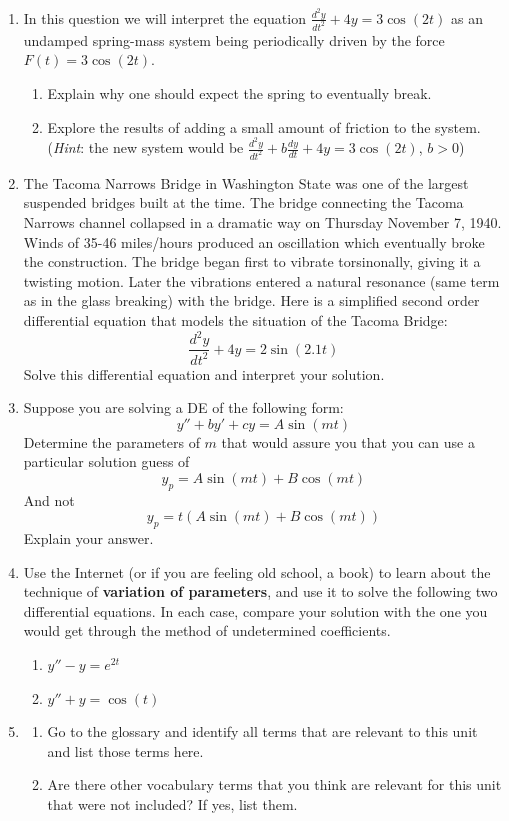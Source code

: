 \begin{enumerate}
\clearpage

\item In this question we will interpret the equation $\displaystyle\frac{d^2y}{dt^2} + 4y = 3\cos(2t)$ as an undamped spring-mass system being periodically driven by the force $F(t) = 3\cos(2t)$. \label{13HWproblem6}
\begin{enumerate}
\item Explain why one should expect the spring to eventually break. \label{13HWproblem6parta}
\item Explore the results of adding a small amount of friction to the system. (\textit{Hint}: the new system would be $\displaystyle\frac{d^2y}{dt^2} + b\frac{dy}{dt} + 4y = 3\cos(2t)$, $b>0$) \label{13HWproblem6partb}
\end{enumerate}

\item The Tacoma Narrows Bridge in Washington State was one of the largest suspended bridges built at the time. The bridge connecting the Tacoma Narrows channel collapsed in a dramatic way on Thursday November 7, 1940. Winds of 35-46 miles/hours produced an oscillation which eventually broke the construction. The bridge began first to vibrate torsinonally, giving it a twisting motion. Later the vibrations entered a natural resonance (same term as in the glass breaking) with the bridge. Here is a simplified second order differential equation that models the situation of the Tacoma Bridge: \label{13HWproblem7}
\[
\frac{d^2y}{dt^2}+4y=2\sin(2.1t)
\]
Solve this differential equation and interpret your solution.

\item Suppose you are solving a DE of the following form: \label{13HWproblem8}
\[
y''+by'+cy=A\sin(mt)
\]
Determine the parameters of $m$ that would assure you that you can use a particular solution guess of
\[
y_p=A\sin(mt)+B\cos(mt)
\]
And not
\[
y_p=t(A\sin(mt)+B\cos(mt))
\]
Explain your answer.

\item Use the Internet (or if you are feeling old school, a book) to learn about the technique of \textbf{variation of parameters}, and use it to solve the following two differential equations. In each case, compare your solution with the one you would get through the method of undetermined coefficients. \label{13HWproblem9}
\begin{enumerate}
\item $y'' - y = e^{2t}$
\item $y'' + y = \cos(t)$
\end{enumerate}

\item \label{13HWproblem10}
\begin{enumerate}
\item Go to the glossary and identify all terms that are relevant to this unit and list those terms here.
\item Are there other vocabulary terms that you think are relevant for this unit that were not included? If yes, list them.
\end{enumerate}


\end{enumerate}




